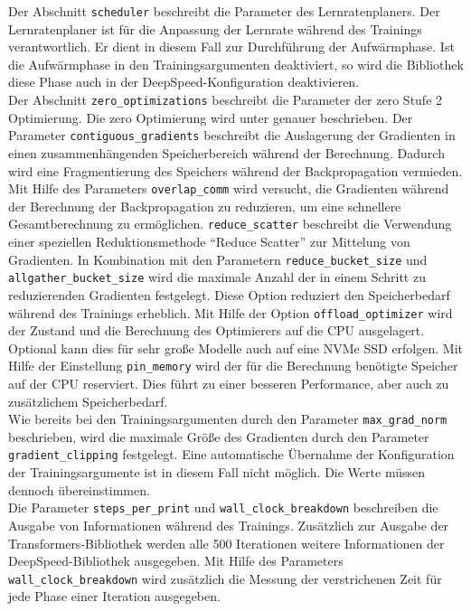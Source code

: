 Der Abschnitt \texttt{scheduler} beschreibt die Parameter des Lernratenplaners. Der Lernratenplaner ist für die Anpassung der Lernrate während des Trainings verantwortlich.
Er dient in diesem Fall zur Durchführung der Aufwärmphase. Ist die Aufwärmphase in den Trainingsargumenten deaktiviert, so wird die Bibliothek diese Phase auch in der DeepSpeed-Konfiguration deaktivieren.\\

Der Abschnitt \texttt{zero\_optimizations} beschreibt die Parameter der \ac{zero} Stufe 2 Optimierung.
Die \ac{zero} Optimierung wird unter \citet{deepspeed} genauer beschrieben.
Der Parameter \texttt{contiguous\_gradients} beschreibt die Auslagerung der Gradienten in einen zusammenhängenden Speicherbereich während der Berechnung.
Dadurch wird eine Fragmentierung des Speichers während der Backpropagation vermieden.
Mit Hilfe des Parameters \texttt{overlap\_comm} wird versucht, die Gradienten während der Berechnung der Backpropagation zu reduzieren, um eine schnellere Gesamtberechnung zu ermöglichen.
\texttt{reduce\_scatter} beschreibt die Verwendung einer speziellen Reduktionsmethode \enquote{Reduce Scatter} zur Mittelung von Gradienten.
In Kombination mit den Parametern \texttt{reduce\_bucket\_size} und \texttt{allgather\_bucket\_size} wird die maximale Anzahl der in einem Schritt zu reduzierenden Gradienten festgelegt.
Diese Option reduziert den Speicherbedarf während des Trainings erheblich.
Mit Hilfe der Option \texttt{offload\_optimizer} wird der Zustand und die Berechnung des Optimierers auf die CPU ausgelagert.
Optional kann dies für sehr große Modelle auch auf eine NVMe SSD erfolgen.
Mit Hilfe der Einstellung \texttt{pin\_memory} wird der für die Berechnung benötigte Speicher auf der CPU reserviert.
Dies führt zu einer besseren Performance, aber auch zu zusätzlichem Speicherbedarf.\\

Wie bereits bei den Trainingsargumenten durch den Parameter \texttt{max\_grad\_norm} beschrieben, wird die maximale Größe des Gradienten durch den Parameter \texttt{gradient\_clipping} festgelegt.
Eine automatische Übernahme der Konfiguration der Trainingsargumente ist in diesem Fall nicht möglich.
Die Werte müssen dennoch übereinstimmen.\\

Die Parameter \texttt{steps\_per\_print} und \texttt{wall\_clock\_breakdown} beschreiben die Ausgabe von Informationen während des Trainings.
Zusätzlich zur Ausgabe der Transformers-Bibliothek werden alle 500 Iterationen weitere Informationen der DeepSpeed-Bibliothek ausgegeben.
Mit Hilfe des Parameters \texttt{wall\_clock\_breakdown} wird zusätzlich die Messung der verstrichenen Zeit für jede Phase einer Iteration ausgegeben.\\

